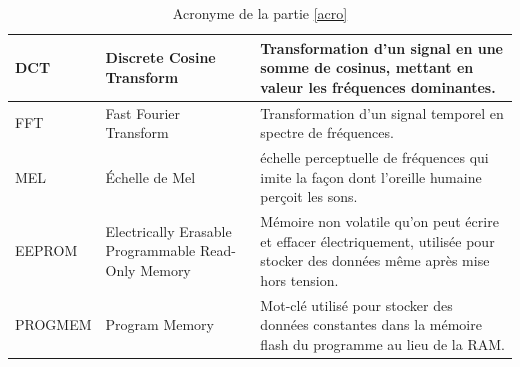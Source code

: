 \documentclass[a4paper,11pt]{article}
\begin{document}
\begin{table}[H]
\begin{tabular}{|l|p{4cm}|p{8cm}|}
\hline
DCT &Discrete Cosine Transform& Transformation d’un signal en une somme de cosinus, mettant en valeur les fréquences dominantes.\\
\hline
FFT & Fast Fourier Transform & Transformation d’un signal temporel en spectre de fréquences. \\
\hline
MEL & Échelle de Mel & échelle perceptuelle de fréquences qui imite la façon dont l’oreille humaine perçoit les sons. \\
\hline
EEPROM & Electrically Erasable Programmable Read-Only Memory & Mémoire non volatile qu’on peut écrire et effacer électriquement, utilisée pour stocker des données même après mise hors tension.\\
\hline
PROGMEM & Program Memory & Mot-clé utilisé pour stocker des données constantes dans la mémoire flash du programme au lieu de la RAM.\\
\hline
\end{tabular}
\caption{Acronyme de la partie \ref{acro}} \label{table:acro}
\end{table}
\end{document}
